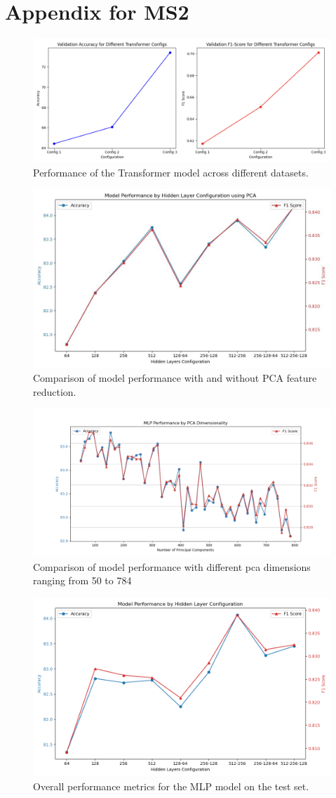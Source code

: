 
\section{Appendix for MS2}

\begin{figure}[H]
    \centering
    \includegraphics[width=0.6\linewidth]{images/transformer.png}
    \caption{Performance of the Transformer model across different datasets.}
    \label{fig:transformer}
\end{figure}

\begin{figure}[H]
    \centering
    \includegraphics[width=0.6\linewidth]{images/model_performance_PCA.jpeg}
    \caption{Comparison of model performance with and without PCA feature reduction.}
    \label{fig:model_performance_PCA}
\end{figure}

\begin{figure}[H]
    \centering
    \includegraphics[width=0.6\linewidth]{images/pca.png}
    \caption{Comparison of model performance with different pca dimensions ranging from 50 to 784}
    \label{fig:model_performance_PCA2}
\end{figure}
\begin{figure}[H]
    \centering
    \includegraphics[width=0.6\linewidth]{images/model_performance.png}
    \caption{Overall performance metrics for the MLP model on the test set.}
    \label{fig:mlp_model_performance}
\end{figure}

